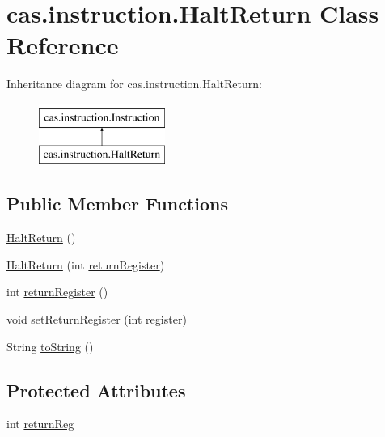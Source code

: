 \hypertarget{classcas_1_1instruction_1_1_halt_return}{\section{cas.\-instruction.\-Halt\-Return Class Reference}
\label{classcas_1_1instruction_1_1_halt_return}
}
Inheritance diagram for cas.\-instruction.\-Halt\-Return\-:\begin{figure}[H]
\begin{center}
\leavevmode
\includegraphics[height=2.000000cm]{classcas_1_1instruction_1_1_halt_return}
\end{center}
\end{figure}
\subsection*{Public Member Functions}
\begin{DoxyCompactItemize}
\item 
\hyperlink{classcas_1_1instruction_1_1_halt_return_a61338ee2f9c8b536d017a0a2460fa462}{Halt\-Return} ()
\item 
\hyperlink{classcas_1_1instruction_1_1_halt_return_a7feb7eee73e043ca07330b890261cf6f}{Halt\-Return} (int \hyperlink{classcas_1_1instruction_1_1_halt_return_a930a6b44e9c51195469ae5c0486b22c9}{return\-Register})
\item 
int \hyperlink{classcas_1_1instruction_1_1_halt_return_a930a6b44e9c51195469ae5c0486b22c9}{return\-Register} ()
\item 
void \hyperlink{classcas_1_1instruction_1_1_halt_return_ac92f107b4b3898da91bc3fa91fab5919}{set\-Return\-Register} (int register)
\item 
String \hyperlink{classcas_1_1instruction_1_1_halt_return_adceb35fd6da0f8bd54140a3c4d5019d5}{to\-String} ()
\end{DoxyCompactItemize}
\subsection*{Protected Attributes}
\begin{DoxyCompactItemize}
\item 
int \hyperlink{classcas_1_1instruction_1_1_halt_return_afd0e3bf0dd3d52b6a0982a9de9aa55d1}{return\-Reg}
\end{DoxyCompactItemize}


